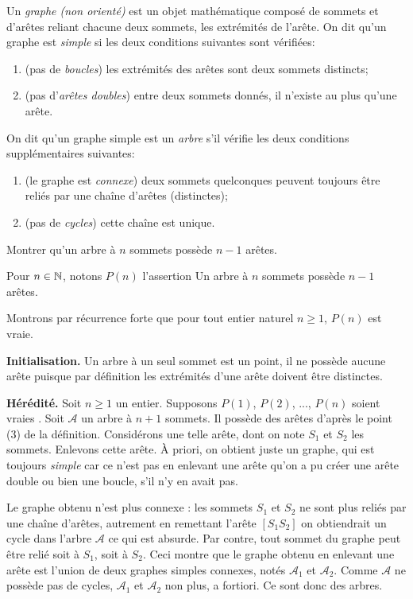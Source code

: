 \begin{exo}
 Un \emph{graphe (non orienté)} est un objet mathématique composé de sommets et d'arêtes reliant chacune deux sommets, les extrémités de l'arête.
On dit qu'un graphe est \emph{simple} si les deux conditions suivantes sont vérifiées:
\begin{enumerate}
\item (\og pas de \emph{boucles}\fg) les extrémités des arêtes sont deux sommets distincts;
\item (\og pas d'\emph{arêtes doubles}\fg) entre deux sommets donnés, il n'existe au plus qu'une arête.
\setcounter{paf}{\value{enumi}}
\end{enumerate}
On dit qu'un graphe simple est un \emph{arbre} s'il vérifie  les deux conditions supplémentaires suivantes:
\begin{enumerate}
\setcounter{enumi}{\value{paf}}
\item (\og le graphe est \emph{connexe}\fg) deux sommets quelconques peuvent toujours être reliés par une chaîne d'arêtes (distinctes);
\item (\og pas de \emph{cycles}\fg) cette chaîne est unique.
\end{enumerate}


Montrer qu'un arbre à $n$ sommets possède $n-1$ arêtes.
\begin{sol}
Pour $n\in \mathbb N$, notons $P(n)$ l'assertion \og Un arbre à $n$ sommets possède $n-1$ arêtes.\fg

Montrons par récurrence forte que pour tout entier naturel $n\geq 1$, $P(n)$ est vraie.

  \textbf{Initialisation.} Un arbre à un seul sommet est un point, il ne possède aucune arête puisque par définition les extrémités d'une arête doivent être distinctes.

  \textbf{Hérédité.} Soit $n\geq 1$ un entier. Supposons $P(1)$, $P(2)$, ..., $P(n)$ soient vraies . Soit $\mathcal A$ un arbre à $n+1$ sommets. Il possède des arêtes d'après le point (3) de la définition. Considérons une telle arête, dont on note $S_1$ et $S_2$ les sommets. Enlevons cette arête. À priori, on obtient juste un graphe, qui est toujours \emph{simple} car ce n'est pas en enlevant une arête qu'on a pu créer une arête double ou bien une boucle, s'il n'y en avait pas.
  
Le graphe obtenu n'est plus connexe :  les sommets $S_1$ et $S_2$ ne sont plus reliés par une chaîne d'arêtes, autrement en remettant l'arête $[S_1S_2]$ on obtiendrait un cycle dans l'arbre $\mathcal A$ ce qui est absurde. Par contre, tout sommet du graphe peut être relié soit à $S_1$, soit à $S_2$. Ceci montre que le graphe obtenu en enlevant une arête est l'union de deux graphes simples connexes, notés $\mathcal A_1$ et $\mathcal A_2$. Comme $\mathcal A$ ne possède pas de cycles, $\mathcal A_1$ et $\mathcal A_2$ non plus, a fortiori. Ce sont donc des arbres.
  

\end{sol}
\end{exo}
